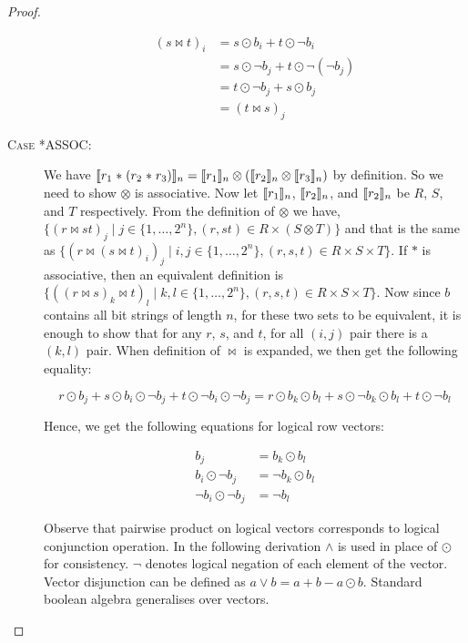 \begin{proof}
\begin{description}
    \begin{align*}
      (s \bowtie t)_i &= s \odot b_i + t \odot \neg b_i \\
                      &= s \odot \neg b_j + t \odot \neg (\neg b_j) \\
                      &= t \odot \neg b_j + s \odot b_j \\
                      &= (t \bowtie s)_j
    \end{align*}

  \item[\textsc{Case *ASSOC}:] We have $\llbracket{r_1 \; \texttt{$\ast$} \;
    (r_2 \; \texttt{$\ast$} \; r_3)}\rrbracket_n = \llbracket{r_1}\rrbracket_n \otimes (\llbracket{r_2}\rrbracket_n
    \otimes \llbracket{r_3}\rrbracket_n)$ by definition. So we need to show $\otimes$ is
    associative. Now let $\llbracket{r_1}\rrbracket_n$, $\llbracket{r_2}\rrbracket_n$, and
    $\llbracket{r_2}\rrbracket_n$ be $R$, $S$, and $T$ respectively. From the definition of
    $\otimes$ we have, $\{ (r \bowtie st)_j \mid j \in \{ 1, \ldots, 2^n\},
    (r, st) \in R \times (S \otimes T) \}$ and that is the same as
    $\{ (r \bowtie (s \bowtie t)_i)_j \mid i,j \in \{ 1, \ldots, 2^n \}, (r,s,t)
    \in R \times S \times T \}$. If $\ast$ is associative, then an equivalent
    definition is $\{ ((r \bowtie s)_k \bowtie t)_l \mid k,l \in \{ 1, \ldots,
    2^n \}, (r,s,t) \in R \times S \times T \}$. Now since $b$ contains all
    bit strings of length $n$, for these two sets to be equivalent, it is
    enough to show that for any $r$, $s$, and $t$, for all $(i,j)$ pair there is
    a $(k,l)$ pair. When definition of $\bowtie$ is expanded, we then get the
    following equality:

    $$r \odot b_j + s \odot b_i \odot \neg b_j + t \odot \neg b_i \odot \neg b_j
    = r \odot b_k \odot b_l + s \odot \neg b_k \odot b_l + t \odot \neg b_l$$

    Hence, we get the following equations for logical row vectors:

    \begin{align}
      b_j & = b_k \odot b_l \\
      b_i \odot \neg b_j & = \neg b_k \odot b_l \\
      \neg b_i \odot \neg b_j & = \neg b_l
    \end{align}

    Observe that pairwise product on logical vectors corresponds to logical
    conjunction operation. In the following derivation $\wedge$ is used in place
    of $\odot$ for consistency. $\neg$ denotes logical negation of each element
    of the vector. Vector disjunction can be defined as $a \vee b = a + b - a
    \odot b$. Standard boolean algebra generalises over vectors.


\end{description}
\end{proof}
